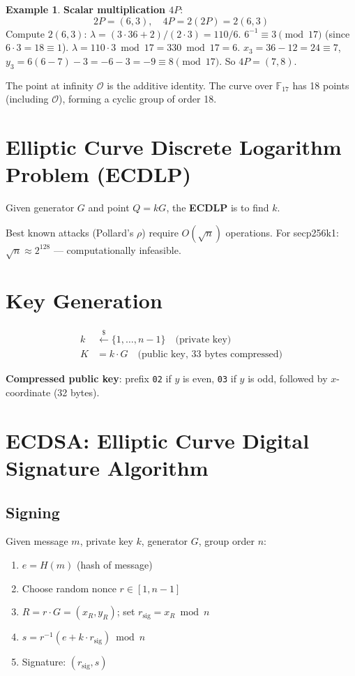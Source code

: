 \documentclass[12pt,a4paper,openany]{book}
\theoremstyle{definition}
\newtheorem{example}{Example}[chapter]
\theoremstyle{plain}
\theoremstyle{remark}
\begin{document}
\begin{example}
  \textbf{Scalar multiplication $4P$}:
  \[
    2P=(6,3),\quad 4P=2(2P)=2(6,3)
  \]
  Compute $2(6,3)$: $\lambda=(3\cdot36+2)/(2\cdot3)=110/6$.
  $6^{-1}\equiv 3\pmod{17}$ (since $6\cdot3=18\equiv1$).
  $\lambda=110\cdot3\bmod17=330\bmod17=6$.
  $x_3=36-12=24\equiv7$, $y_3=6(6-7)-3=-6-3=-9\equiv8\pmod{17}$.
  So $4P=(7,8)$.
\end{example}

The point at infinity $\mathcal{O}$ is the additive identity.
The curve over $\mathbb{F}_{17}$ has 18 points (including $\mathcal{O}$),
forming a cyclic group of order 18.

\section{Elliptic Curve Discrete Logarithm Problem (ECDLP)}

\begin{definitionbox}
  Given generator $G$ and point $Q=kG$, the \textbf{ECDLP} is to find $k$.
\end{definitionbox}

Best known attacks (Pollard's $\rho$) require $O(\sqrt{n})$ operations.
For secp256k1: $\sqrt{n}\approx 2^{128}$ — computationally infeasible.

\section{Key Generation}

\begin{align}
  k &\xleftarrow{\$} \{1,\ldots,n-1\} \quad\text{(private key)} \\
  \boxed{K} &= \boxed{k\cdot G} \quad\text{(public key, 33 bytes compressed)}
\end{align}

\textbf{Compressed public key}: prefix \texttt{02} if $y$ is even,
\texttt{03} if $y$ is odd, followed by $x$-coordinate (32 bytes).

\section{ECDSA: Elliptic Curve Digital Signature Algorithm}

\subsection{Signing}

Given message $m$, private key $k$, generator $G$, group order $n$:
\begin{enumerate}
  \item $e = H(m)$ \quad (hash of message)
  \item Choose random nonce $r\in[1,n-1]$
  \item $R = r\cdot G = (x_R,y_R)$; set $r_{\text{sig}} = x_R\bmod n$
  \item $s = r^{-1}(e + k\cdot r_{\text{sig}})\bmod n$
  \item Signature: $(r_{\text{sig}},s)$
\end{enumerate}
\end{document}
